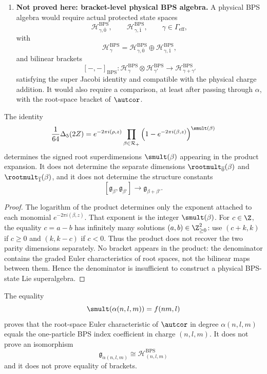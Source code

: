 \begin{definition}
\begin{enumerate}
\item \textbf{Not proved here: bracket-level physical BPS algebra.}
A physical BPS algebra would require actual protected state spaces
$$
\mathcal H_{\gamma,\overline0}^{\mathrm{BPS}},\qquad
\mathcal H_{\gamma,\overline1}^{\mathrm{BPS}},
\qquad \gamma\in\Gamma_{\mathrm{eff}},
$$
with
$$
\mathcal H_{\gamma}^{\mathrm{BPS}}
=\mathcal H_{\gamma,\overline0}^{\mathrm{BPS}}
\oplus
\mathcal H_{\gamma,\overline1}^{\mathrm{BPS}},
$$
and bilinear brackets
$$
[-,-]_{\mathrm{BPS}}:
\mathcal H_{\gamma}^{\mathrm{BPS}}\otimes
\mathcal H_{\gamma'}^{\mathrm{BPS}}
\longrightarrow
\mathcal H_{\gamma+\gamma'}^{\mathrm{BPS}}
$$
satisfying the super Jacobi identity and compatible with the physical
charge addition.  It would also require a comparison, at least after
passing through $\alpha$, with the root-space bracket of $\autcor$.
\end{enumerate}
\end{definition}

\begin{proposition}
The identity
$$
\frac1{64}\Delta_5(2Z)
=e^{-2\pi i(\rho,z)}
\prod_{\beta\in\mathcal R_+}
\left(1-e^{-2\pi i(\beta,z)}\right)^{\smult(\beta)}
$$
determines the signed root superdimensions $\smult(\beta)$ appearing in
the product expansion.  It does not determine the separate dimensions
$\rootmult_{\overline0}(\beta)$ and $\rootmult_{\overline1}(\beta)$, and it
does not determine the structure constants
$$
[\mathfrak g_\beta,\mathfrak g_{\beta'}]\longrightarrow
\mathfrak g_{\beta+\beta'}.
$$
\end{proposition}

\begin{proof}
The logarithm of the product determines only the exponent attached to each
monomial $e^{-2\pi i(\beta,z)}$.  That exponent is the integer
$\smult(\beta)$.  For $c\in\Z$, the equality $c=a-b$ has infinitely many
solutions $(a,b)\in\Z_{\geq0}^2$: use $(c+k,k)$ if $c\geq0$ and
$(k,k-c)$ if $c<0$.  Thus the product does not recover the two parity
dimensions separately.  No bracket appears in the product:
the denominator contains the graded Euler characteristics of root spaces,
not the bilinear maps between them.  Hence the denominator is insufficient
to construct a physical BPS-state Lie superalgebra.
\end{proof}

\begin{proposition}
The equality
$$
\smult(\alpha(n,l,m))=f(nm,l)
$$
proves that the root-space Euler characteristic of $\autcor$ in degree
$\alpha(n,l,m)$ equals the one-particle BPS index coefficient in charge
$(n,l,m)$.  It does not prove an isomorphism
$$
\mathfrak g_{\alpha(n,l,m)}
\cong
\mathcal H_{(n,l,m)}^{\mathrm{BPS}}
$$
and it does not prove equality of brackets.
\end{proposition}

